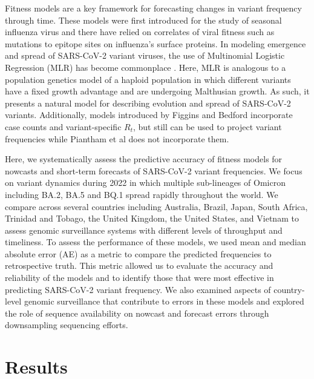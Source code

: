 Fitness models are a key framework for forecasting changes in variant frequency through time.
These models were first introduced for the study of seasonal influenza virus \cite{luksza2014predictive, morris2018predictive, huddleston2020integrating} and there have relied on correlates of viral fitness such as mutations to epitope sites on influenza's surface proteins.
In modeling emergence and spread of SARS-CoV-2 variant viruses, the use of Multinomial Logistic Regression (MLR) has become commonplace \cite{annavajhala2021emergence, faria2021genomics, obermeyer2022analysis, susswein2023early}.
Here, MLR is analogous to a population genetics model of a haploid population in which different variants have a fixed growth advantage and are undergoing Malthusian growth.
As such, it presents a natural model for describing evolution and spread of SARS-CoV-2 variants.
Additionally, models introduced by Figgins and Bedford \cite{Figgins2021} incorporate case counts and variant-specific $R_t$, but still can be used to project variant frequencies while Piantham et al \cite{piantham2021estimating} does not incorporate them.

Here, we systematically assess the predictive accuracy of fitness models for nowcasts and short-term forecasts of SARS-CoV-2 variant frequencies.
We focus on variant dynamics during 2022 in which multiple sub-lineages of Omicron including BA.2, BA.5 and BQ.1 spread rapidly throughout the world.
We compare across several countries including Australia, Brazil, Japan, South Africa, Trinidad and Tobago, the United Kingdom, the United States, and Vietnam to assess genomic surveillance systems with different levels of throughput and timeliness.
To assess the performance of these models, we used mean and median absolute error (AE) as a metric to compare the predicted frequencies to retrospective truth.
This metric allowed us to evaluate the accuracy and reliability of the models and to identify those that were most effective in predicting SARS-CoV-2 variant frequency.
We also examined aspects of country-level genomic surveillance that contribute to errors in these models and explored the role of sequence availability on nowcast and forecast errors through downsampling sequencing efforts.

\section{Results}

